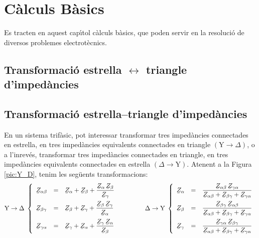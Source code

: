 \chapter{C\`{a}lculs B\`{a}sics}

Es tracten en aquest cap\'{\i}tol c\`{a}lculs b\`{a}sics, que poden servir en la
resoluci\'{o} de diversos problemes electrot\`{e}cnics.

\ifpdf
    \section{\texorpdfstring{Transformaci\'{o} estrella $\boldsymbol{\leftrightarrow}$ triangle d'imped\`{a}ncies}
    {Transformaci\'{o} estrella-triangle d'imped\`{a}ncies}}
\else
    \section{Transformaci\'{o} estrella--triangle d'imped\`{a}ncies}
\fi
\label{secc:d_y} 

En un sistema trif\`{a}sic, pot interessar transformar tres imped\`{a}ncies connectades en
estrella, en tres imped\`{a}ncies equivalents connectades en triangle
$(\text{Y}\rightarrow\Delta)$, o a l'inrev\'{e}s, transformar tres imped\`{a}ncies connectades en
triangle, en tres imped\`{a}ncies equivalents connectades en estrella
$(\Delta\rightarrow\text{Y})$. Atenent a la Figura \vref{pic:Y_D}, tenim les seg\"{u}ents
transformacions:
\begin{equation}\label{eq:Y_D}
   \text{Y}\rightarrow\Delta\;\left\{
   \begin{array}{lll}
      \cmplx{Z}_{\alpha\beta} &= &\displaystyle \cmplx{Z}_{\alpha} + \cmplx{Z}_{\beta} + \frac{\cmplx{Z}_{\alpha}\,\cmplx{Z}_{\beta}}{\cmplx{Z}_{\gamma}}  \\[2.5ex]
      \cmplx{Z}_{\beta\gamma} &= &\displaystyle \cmplx{Z}_{\beta} + \cmplx{Z}_{\gamma} + \frac{\cmplx{Z}_{\beta}\,\cmplx{Z}_{\gamma}}{\cmplx{Z}_{\alpha}}  \\[2.5ex]
      \cmplx{Z}_{\gamma\alpha} &= &\displaystyle \cmplx{Z}_{\gamma} + \cmplx{Z}_{\alpha} + \frac{\cmplx{Z}_{\gamma}\, \cmplx{Z}_{\alpha}}{\cmplx{Z}_{\beta}}
   \end{array}
   \right.
   \qquad\qquad
   \Delta\rightarrow\text{Y}\;\left\{
   \begin{array}{lll}
      \cmplx{Z}_{\alpha} &= &\dfrac{\cmplx{Z}_{\alpha\beta}\, \cmplx{Z}_{\gamma\alpha}}{  \cmplx{Z}_{\alpha\beta} + \cmplx{Z}_{\beta\gamma}+ \cmplx{Z}_{\gamma\alpha}}  \\[2.5ex]
      \cmplx{Z}_{\beta} &= &\dfrac{\cmplx{Z}_{\beta\gamma}\, \cmplx{Z}_{\alpha\beta}}{  \cmplx{Z}_{\alpha\beta} + \cmplx{Z}_{\beta\gamma}+ \cmplx{Z}_{\gamma\alpha}}  \\[2.5ex]
      \cmplx{Z}_{\gamma} &= &\dfrac{\cmplx{Z}_{\gamma\alpha}\, \cmplx{Z}_{\beta\gamma}}{  \cmplx{Z}_{\alpha\beta} + \cmplx{Z}_{\beta\gamma}+ \cmplx{Z}_{\gamma\alpha}}
   \end{array}
   \right.
\end{equation}

